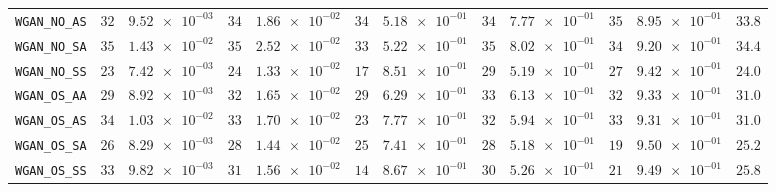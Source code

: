 \begin{xltabular}{\textwidth}{l||cC|cC|cC|cC|cC||c}
	\texttt{WGAN\_NO\_AS} & $ 32$ & $ \num{9.52e-03}$ & $ 34$ & $ \num{1.86e-02}$ & $ 34$ & $ \num{5.18e-01}$ & $ 34$ & $ \num{7.77e-01}$ & $ 35$ & $ \num{8.95e-01}$ & $ 33.8$  \\
	\texttt{WGAN\_NO\_SA} & $ 35$ & $ \num{1.43e-02}$ & $ 35$ & $ \num{2.52e-02}$ & $ 33$ & $ \num{5.22e-01}$ & $ 35$ & $ \num{8.02e-01}$ & $ 34$ & $ \num{9.20e-01}$ & $ 34.4$  \\
	\texttt{WGAN\_NO\_SS} & $ 23$ & $ \num{7.42e-03}$ & $ 24$ & $ \num{1.33e-02}$ & $ 17$ & $ \num{8.51e-01}$ & $ 29$ & $ \num{5.19e-01}$ & $ 27$ & $ \num{9.42e-01}$ & $ 24.0$  \\
	\texttt{WGAN\_OS\_AA} & $ 29$ & $ \num{8.92e-03}$ & $ 32$ & $ \num{1.65e-02}$ & $ 29$ & $ \num{6.29e-01}$ & $ 33$ & $ \num{6.13e-01}$ & $ 32$ & $ \num{9.33e-01}$ & $ 31.0$  \\
	\texttt{WGAN\_OS\_AS} & $ 34$ & $ \num{1.03e-02}$ & $ 33$ & $ \num{1.70e-02}$ & $ 23$ & $ \num{7.77e-01}$ & $ 32$ & $ \num{5.94e-01}$ & $ 33$ & $ \num{9.31e-01}$ & $ 31.0$  \\
	\texttt{WGAN\_OS\_SA} & $ 26$ & $ \num{8.29e-03}$ & $ 28$ & $ \num{1.44e-02}$ & $ 25$ & $ \num{7.41e-01}$ & $ 28$ & $ \num{5.18e-01}$ & $ 19$ & $ \num{9.50e-01}$ & $ 25.2$  \\
	\texttt{WGAN\_OS\_SS} & $ 33$ & $ \num{9.82e-03}$ & $ 31$ & $ \num{1.56e-02}$ & $ 14$ & $ \num{8.67e-01}$ & $ 30$ & $ \num{5.26e-01}$ & $ 21$ & $ \num{9.49e-01}$ & $ 25.8$  \\

\end{xltabular}
